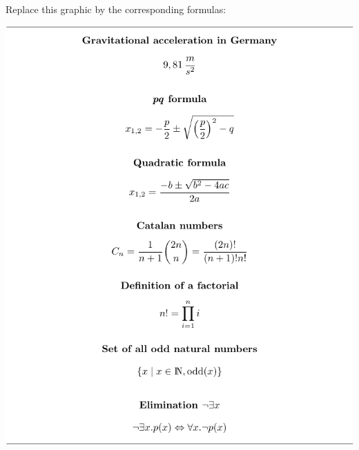 Replace this graphic by the corresponding formulas:

\vspace{1cm} %
\includegraphics{graphics/math-formulas.rend-crop.pdf}
